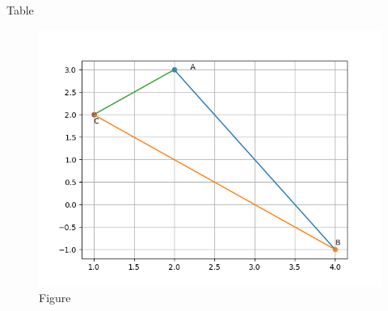 \documentclass[journal,12pt,twocolumn]{IEEEtran}
\begin{document}
\begin{enumerate}

\end{enumerate}

\begin{table}[h!] 
\centering
        
        \caption{Table}
        \label{tab:}
\end{table} 

\begin{figure}[h!]
  \centering
   \includegraphics[width=\linewidth]{figs/figure_1.png}
   \caption{Figure}
   \label{fig:}
\end{figure}

\end{document}
